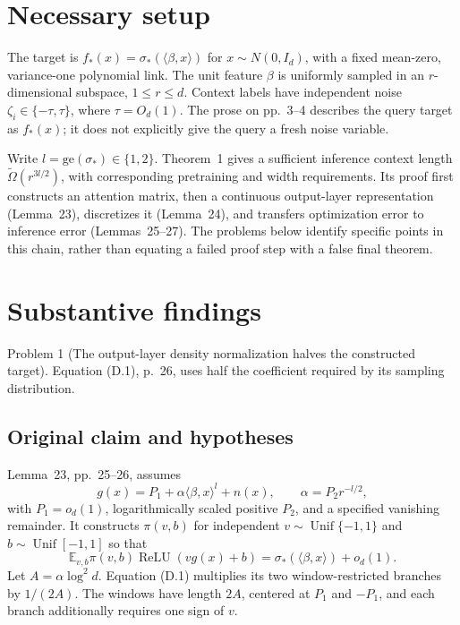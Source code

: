\documentclass[10pt]{article}
\begin{document}
\section*{Necessary setup}
The target is \(f_*(x)=\sigma_*(\langle\beta,x\rangle)\) for \(x\sim N(0,I_d)\), with a fixed mean-zero, variance-one polynomial link. The unit feature \(\beta\) is uniformly sampled in an \(r\)-dimensional subspace, \(1\le r\le d\). Context labels have independent noise \(\zeta_i\in\{-\tau,\tau\}\), where \(\tau=O_d(1)\). The prose on pp. 3–4 describes the query target as \(f_*(x)\); it does not explicitly give the query a fresh noise variable.\par
Write \(l=\mathrm{ge}(\sigma_*)\in\{1,2\}\). Theorem 1 gives a sufficient inference context length \(\widetilde\Omega(r^{3l/2})\), with corresponding pretraining and width requirements. Its proof first constructs an attention matrix, then a continuous output-layer representation (Lemma 23), discretizes it (Lemma 24), and transfers optimization error to inference error (Lemmas 25–27). The problems below identify specific points in this chain, rather than equating a failed proof step with a false final theorem.\par
\section*{Substantive findings}
Problem 1 (The output-layer density normalization halves the constructed target).  Equation (D.1), p. 26, uses half the coefficient required by its sampling distribution.\par
\subsection*{Original claim and hypotheses}
Lemma 23, pp. 25–26, assumes \[g(x)=P_1+\alpha\langle\beta,x\rangle^l+n(x),\qquad
 \alpha=P_2r^{-l/2},\] with \(P_1=o_d(1)\), logarithmically scaled positive \(P_2\), and a specified vanishing remainder. It constructs \(\pi(v,b)\) for independent \(v\sim\operatorname{Unif}\{-1,1\}\) and \(b\sim\operatorname{Unif}[-1,1]\) so that \[\mathbb E_{v,b}\pi(v,b)\operatorname{ReLU}(vg(x)+b)
 =\sigma_*(\langle\beta,x\rangle)+o_d(1).\] Let \(A=\alpha\log^2d\). Equation (D.1) multiplies its two window-restricted branches by \(1/(2A)\). The windows have length \(2A\), centered at \(P_1\) and \(-P_1\), and each branch additionally requires one sign of \(v\).\par
\end{document}
